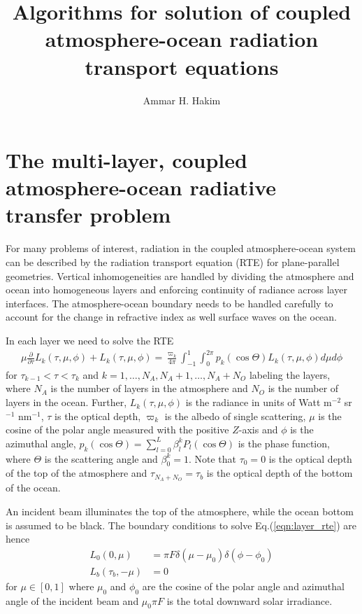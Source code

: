 \documentclass[11pt, reqno]{amsart}
\title{Algorithms for solution of coupled atmosphere-ocean radiation
  transport equations}%
\author{Ammar H. Hakim}%
\date{}
\newcommand{\eqr}[1]{Eq.\thinspace(#1)}
\newcommand{\pfraca}[1]{\frac{\partial}{\partial #1}}
\theoremstyle{definition}
\begin{document}
\maketitle

\section{The multi-layer, coupled atmosphere-ocean radiative transfer
  problem}

For many problems of interest, radiation in the coupled
atmosphere-ocean system can be described by the radiation transport
equation (RTE) for plane-parallel geometries. Vertical inhomogeneities
are handled by dividing the atmosphere and ocean into homogeneous
layers and enforcing continuity of radiance across layer
interfaces. The atmosphere-ocean boundary needs to be handled
carefully to account for the change in refractive index as well
surface waves on the ocean.

In each layer we need to solve the RTE
\begin{align}
  \mu\pfraca{\tau}L_k(\tau,\mu,\phi) + L_k(\tau,\mu,\phi)
  =
  \frac{\varpi_k}{4\pi}
  \int_{-1}^1 \int_0^{2\pi}
  p_k(\cos\Theta) L_k(\tau,\mu,\phi) d\mu d\phi
  \label{eqn:layer_rte}
\end{align}
for $\tau_{k-1} < \tau < \tau_k$ and
$k=1,\ldots,N_A,N_A+1,\ldots,N_A+N_O$ labeling the layers, where $N_A$
is the number of layers in the atmosphere and $N_O$ is the number of
layers in the ocean. Further, $L_k(\tau,\mu,\phi)$ is the radiance in
units of Watt m$^{-2}$ sr$^{-1}$ nm$^{-1}$, $\tau$ is the optical
depth, $\varpi_k$ is the albedo of single scattering, $\mu$ is the
cosine of the polar angle measured with the positive $Z$-axis and
$\phi$ is the azimuthal angle, $p_k(\cos\Theta) =
\sum_{l=0}^L\beta^k_lP_l(\cos\Theta)$ is the phase function, where
$\Theta$ is the scattering angle and $\beta^k_0=1$. Note that
$\tau_0=0$ is the optical depth of the top of the atmosphere and
$\tau_{N_A+N_O}=\tau_b$ is the optical depth of the bottom of the
ocean.

An incident beam illuminates the top of the atmosphere, while the
ocean bottom is assumed to be black. The boundary conditions to solve
\eqr{\ref{eqn:layer_rte}} are hence
\begin{align}
  L_0(0, \mu) &= \pi F \delta(\mu-\mu_0) \delta(\phi-\phi_0) \\
  L_b(\tau_b, -\mu) &= 0
\end{align}
for $\mu\in [0,1]$ where $\mu_0$ and $\phi_0$ are the cosine of the
polar angle and azimuthal angle of the incident beam and $\mu_0\pi F$
is the total downward solar irradiance.
\end{document}
